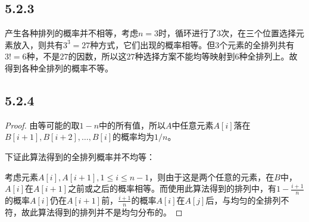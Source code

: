 \documentclass[twocolumn]{article}
\begin{document}
	\subsection*{5.2.3}
	产生各种排列的概率并不相等，考虑$n=3$时，循环进行了$3$次，在三个位置选择元素放入，则共有$3^3=27$种方式，它们出现的概率相等。但$3$个元素的全排列共有$3!=6$种，不是$27$的因数，所以这$27$种选择方案不能均等映射到$6$种全排列上。故得到各种全排列的概率不等。
	\subsection*{5.2.4}
	\begin{proof}
		由等可能的取$1-n$中的所有值，所以$A$中任意元素$A[i]$落在$B[i+1],B[i+2],\dots,B[i]$的概率均为$1/n$。\par 
		下证此算法得到的全排列概率并不均等：\par 
		考虑元素$A[i],A[i+1],1\le i\le n-1$，则由于这是两个任意的元素，在$B$中，$A[i]$在$A[i+1]$之前或之后的概率相等。而使用此算法得到的排列中，有$1-\frac{i+1}{n}$的概率$A[i]$仍在$A[i+1]$前，$\frac{i+1}{n}$的概率$A[i]$在$A[j]$后，与均匀的全排列不符，故此算法得到的排列并不是均匀分布的。
	\end{proof}
\end{document}
